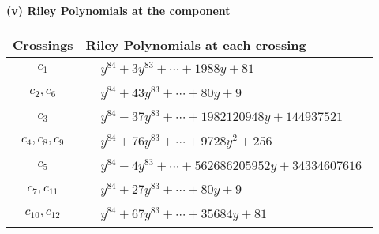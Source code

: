 \documentclass[1p]{elsarticle_modified}
\theoremstyle{definition}
\begin{document}
\flushleft \textbf{(v) Riley Polynomials at the component}\newline \\
\begin{tabular}{m{50pt}|m{274pt}}
Crossings & \hspace{64pt}Riley Polynomials at each crossing \\
\hline $$\begin{aligned}c_{1}\end{aligned}$$&$\begin{aligned}
&y^{84}+3 y^{83}+\cdots+1988 y+81
\end{aligned}$\\
\hline $$\begin{aligned}c_{2},c_{6}\end{aligned}$$&$\begin{aligned}
&y^{84}+43 y^{83}+\cdots+80 y+9
\end{aligned}$\\
\hline $$\begin{aligned}c_{3}\end{aligned}$$&$\begin{aligned}
&y^{84}-37 y^{83}+\cdots+1982120948 y+144937521
\end{aligned}$\\
\hline $$\begin{aligned}c_{4},c_{8},c_{9}\end{aligned}$$&$\begin{aligned}
&y^{84}+76 y^{83}+\cdots+9728 y^2+256
\end{aligned}$\\
\hline $$\begin{aligned}c_{5}\end{aligned}$$&$\begin{aligned}
&y^{84}-4 y^{83}+\cdots+562686205952 y+34334607616
\end{aligned}$\\
\hline $$\begin{aligned}c_{7},c_{11}\end{aligned}$$&$\begin{aligned}
&y^{84}+27 y^{83}+\cdots+80 y+9
\end{aligned}$\\
\hline $$\begin{aligned}c_{10},c_{12}\end{aligned}$$&$\begin{aligned}
&y^{84}+67 y^{83}+\cdots+35684 y+81
\end{aligned}$\\
\hline
\end{tabular}\\~\\
\end{document}
